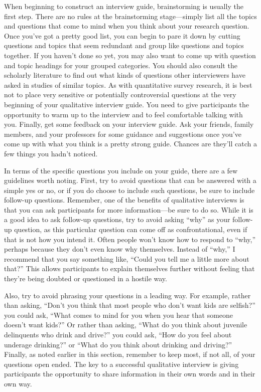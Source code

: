 When beginning to construct an interview guide, brainstorming is usually the first step. There are no rules at the brainstorming stage—simply list all the topics and questions that come to mind when you think about your research question. Once you’ve got a pretty good list, you can begin to pare it down by cutting questions and topics that seem redundant and group like questions and topics together. If you haven’t done so yet, you may also want to come up with question and topic headings for your grouped categories. You should also consult the scholarly literature to find out what kinds of questions other interviewers have asked in studies of similar topics. As with quantitative survey research, it is best not to place very sensitive or potentially controversial questions at the very beginning of your qualitative interview guide. You need to give participants the opportunity to warm up to the interview and to feel comfortable talking with you. Finally, get some feedback on your interview guide. Ask your friends, family members, and your professors for some guidance and suggestions once you’ve come up with what you think is a pretty strong guide. Chances are they’ll catch a few things you hadn’t noticed.

In terms of the specific questions you include on your guide, there are a few guidelines worth noting. First, try to avoid questions that can be answered with a simple yes or no, or if you do choose to include such questions, be sure to include follow-up questions. Remember, one of the benefits of qualitative interviews is that you can ask participants for more information—be sure to do so. While it is a good idea to ask follow-up questions, try to avoid asking “why” as your follow-up question, as this particular question can come off as confrontational, even if that is not how you intend it. Often people won’t know how to respond to “why,” perhaps because they don’t even know why themselves. Instead of “why,” I recommend that you say something like, “Could you tell me a little more about that?” This allows participants to explain themselves further without feeling that they’re being doubted or questioned in a hostile way.

Also, try to avoid phrasing your questions in a leading way. For example, rather than asking, “Don’t you think that most people who don’t want kids are selfish?” you could ask, “What comes to mind for you when you hear that someone doesn’t want kids?” Or rather than asking, “What do you think about juvenile delinquents who drink and drive?” you could ask, “How do you feel about underage drinking?” or “What do you think about drinking and driving?” Finally, as noted earlier in this section, remember to keep most, if not all, of your questions open ended. The key to a successful qualitative interview is giving participants the opportunity to share information in their own words and in their own way.

